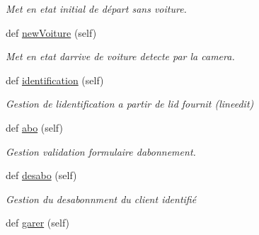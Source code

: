 \begin{DoxyCompactItemize}
\begin{DoxyCompactList}\small\item\em Met en etat initial de départ sans voiture. \end{DoxyCompactList}\item 
\hypertarget{classsrc_1_1c_1_1_borne_1_1_borne_afdc7ac565991a74e090c4a3fb3366c70}{}def \hyperlink{classsrc_1_1c_1_1_borne_1_1_borne_afdc7ac565991a74e090c4a3fb3366c70}{new\+Voiture} (self)\label{classsrc_1_1c_1_1_borne_1_1_borne_afdc7ac565991a74e090c4a3fb3366c70}

\begin{DoxyCompactList}\small\item\em Met en etat d\textquotesingle{}arrive de voiture detecte par la camera. \end{DoxyCompactList}\item 
\hypertarget{classsrc_1_1c_1_1_borne_1_1_borne_a689b26fd9e4746d963118a39503066a6}{}def \hyperlink{classsrc_1_1c_1_1_borne_1_1_borne_a689b26fd9e4746d963118a39503066a6}{identification} (self)\label{classsrc_1_1c_1_1_borne_1_1_borne_a689b26fd9e4746d963118a39503066a6}

\begin{DoxyCompactList}\small\item\em Gestion de l\textquotesingle{}identification a partir de l\textquotesingle{}id fournit (lineedit) \end{DoxyCompactList}\item 
\hypertarget{classsrc_1_1c_1_1_borne_1_1_borne_a3c4504cbad259c284f9ad75bd29f91da}{}def \hyperlink{classsrc_1_1c_1_1_borne_1_1_borne_a3c4504cbad259c284f9ad75bd29f91da}{abo} (self)\label{classsrc_1_1c_1_1_borne_1_1_borne_a3c4504cbad259c284f9ad75bd29f91da}

\begin{DoxyCompactList}\small\item\em Gestion validation formulaire d\textquotesingle{}abonnement. \end{DoxyCompactList}\item 
\hypertarget{classsrc_1_1c_1_1_borne_1_1_borne_a4ff8464abd412a6aae13519bacfca764}{}def \hyperlink{classsrc_1_1c_1_1_borne_1_1_borne_a4ff8464abd412a6aae13519bacfca764}{desabo} (self)\label{classsrc_1_1c_1_1_borne_1_1_borne_a4ff8464abd412a6aae13519bacfca764}

\begin{DoxyCompactList}\small\item\em Gestion du desabonnment du client identifié \end{DoxyCompactList}\item 
\hypertarget{classsrc_1_1c_1_1_borne_1_1_borne_ab93bf418e282ef161ee36cee00130a54}{}def \hyperlink{classsrc_1_1c_1_1_borne_1_1_borne_ab93bf418e282ef161ee36cee00130a54}{garer} (self)\label{classsrc_1_1c_1_1_borne_1_1_borne_ab93bf418e282ef161ee36cee00130a54}


\end{DoxyCompactItemize}
